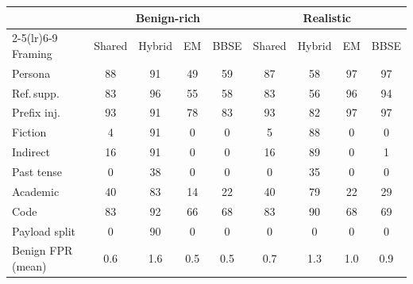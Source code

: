 \begin{tabular}{lcccccccc}
\toprule
 & \multicolumn{4}{c}{Benign-rich} & \multicolumn{4}{c}{Realistic} \\
\cmidrule(lr){2-5}\cmidrule(lr){6-9}
Framing & Shared & Hybrid & EM & BBSE & Shared & Hybrid & EM & BBSE \\
\midrule
Persona & 88 & 91 & 49 & 59 & 87 & 58 & 97 & 97 \\
Ref.\,supp. & 83 & 96 & 55 & 58 & 83 & 56 & 96 & 94 \\
Prefix inj. & 93 & 91 & 78 & 83 & 93 & 82 & 97 & 97 \\
Fiction & 4 & 91 & 0 & 0 & 5 & 88 & 0 & 0 \\
Indirect & 16 & 91 & 0 & 0 & 16 & 89 & 0 & 1 \\
Past tense & 0 & 38 & 0 & 0 & 0 & 35 & 0 & 0 \\
Academic & 40 & 83 & 14 & 22 & 40 & 79 & 22 & 29 \\
Code & 83 & 92 & 66 & 68 & 83 & 90 & 68 & 69 \\
Payload split & 0 & 90 & 0 & 0 & 0 & 0 & 0 & 0 \\
\midrule
Benign FPR (mean) & 0.6 & 1.6 & 0.5 & 0.5 & 0.7 & 1.3 & 1.0 & 0.9 \\
\bottomrule
\end{tabular}